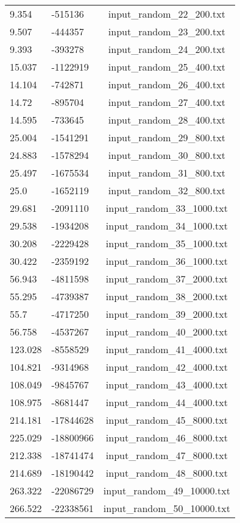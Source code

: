 \begin{longtable}[hb]{|l|l|c|}
  9.354 & -515136 & input\_random\_22\_200.txt \\
  9.507 & -444357 & input\_random\_23\_200.txt \\
  9.393 & -393278 & input\_random\_24\_200.txt \\
  15.037 & -1122919 & input\_random\_25\_400.txt \\
  14.104 & -742871 & input\_random\_26\_400.txt \\
  14.72 & -895704 & input\_random\_27\_400.txt \\
  14.595 & -733645 & input\_random\_28\_400.txt \\
  25.004 & -1541291 & input\_random\_29\_800.txt \\
  24.883 & -1578294 & input\_random\_30\_800.txt \\
  25.497 & -1675534 & input\_random\_31\_800.txt \\
  25.0 & -1652119 & input\_random\_32\_800.txt \\
  29.681 & -2091110 & input\_random\_33\_1000.txt \\
  29.538 & -1934208 & input\_random\_34\_1000.txt \\
  30.208 & -2229428 & input\_random\_35\_1000.txt \\
  30.422 & -2359192 & input\_random\_36\_1000.txt \\
  56.943 & -4811598 & input\_random\_37\_2000.txt \\
  55.295 & -4739387 & input\_random\_38\_2000.txt \\
  55.7 & -4717250 & input\_random\_39\_2000.txt \\
  56.758 & -4537267 & input\_random\_40\_2000.txt \\
  123.028 & -8558529 & input\_random\_41\_4000.txt \\
  104.821 & -9314968 & input\_random\_42\_4000.txt \\
  108.049 & -9845767 & input\_random\_43\_4000.txt \\
  108.975 & -8681447 & input\_random\_44\_4000.txt \\
  214.181 & -17844628 & input\_random\_45\_8000.txt \\
  225.029 & -18800966 & input\_random\_46\_8000.txt \\
  212.338 & -18741474 & input\_random\_47\_8000.txt \\
  214.689 & -18190442 & input\_random\_48\_8000.txt \\
  263.322 & -22086729 & input\_random\_49\_10000.txt \\
  266.522 & -22338561 & input\_random\_50\_10000.txt \\

\end{longtable}
